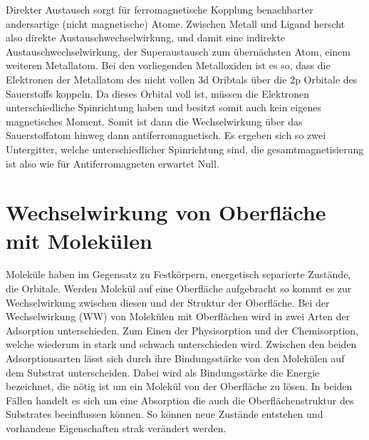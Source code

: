             Direkter Austausch sorgt für ferromagnetische Kopplung benachbarter andersartige (nicht magnetische) Atome.
            Zwischen Metall und Ligand herscht also direkte Austauschwechselwirkung, und damit eine indirekte Austauschwechselwirkung, der Superaustausch zum übernächsten Atom, einem weiteren Metallatom.
            Bei den vorliegenden Metalloxiden ist es so, dass die Elektronen der Metallatom des nicht vollen 3d Oribtals über die 2p Orbitale des Sauerstoffs koppeln.
            Da dieses Orbital voll ist, müssen die Elektronen unterschiedliche Spinrichtung haben und besitzt somit auch kein eigenes magnetisches Moment.
            Somit ist dann die Wechselwirkung über das Sauerstoffatom hinweg dann antiferromagnetisch.
            Es ergeben sich so zwei Untergitter, welche unterschiedlicher Spinrichtung sind, die gesamtmagnetisierung ist also wie für Antiferromagneten erwartet Null.
            
            
    
    \section{Wechselwirkung von Oberfläche mit Molekülen}
        Moleküle haben im Gegensatz zu Festkörpern, energetisch separierte Zustände, die Orbitale.
        Werden Molekül auf eine Oberfläche aufgebracht so kommt es zur Wechselwirkung zwischen diesen und der Struktur der Oberfläche.
        Bei der Wechselwirkung (WW) von Molekülen mit Oberflächen wird in zwei Arten der Adsorption unterschieden. 
        Zum Einen der Physisorption und der Chemisorption, welche wiederum in stark und schwach unterschieden wird.
        Zwischen den beiden Adsorptionsarten lässt sich durch ihre Bindungsstärke von den Molekülen auf dem Substrat unterscheiden.
        Dabei wird als Bindungsstärke die Energie bezeichnet, die nötig ist um ein Molekül von der Oberfläche zu lösen.
        In beiden Fällen handelt es sich um eine Absorption die auch die Oberflächenstruktur des Substrates beeinflussen können.
        So können neue Zustände entstehen und vorhandene Eigenschaften strak verändert werden.
        
        
